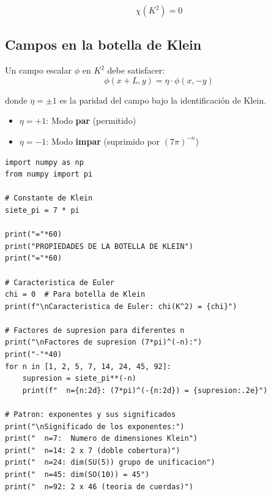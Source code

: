 \documentclass[12pt,a4paper,openany]{book}
\begin{document}
\begin{nivelmatematico}
\begin{equation}
    \chi(K^2) = 0
\end{equation}

\subsection*{Campos en la botella de Klein}

Un campo escalar $\phi$ en $K^2$ debe satisfacer:
\begin{equation}
    \phi(x + L, y) = \eta \cdot \phi(x, -y)
\end{equation}

donde $\eta = \pm 1$ es la paridad del campo bajo la identificación de Klein.

\begin{itemize}
    \item $\eta = +1$: Modo \textbf{par} (permitido)
    \item $\eta = -1$: Modo \textbf{impar} (suprimido por $(7\pi)^{-n}$)
\end{itemize}

\end{nivelmatematico}

\begin{nivelcodigo}

\begin{lstlisting}[caption={Verificación de propiedades topológicas}]
import numpy as np
from numpy import pi

# Constante de Klein
siete_pi = 7 * pi

print("="*60)
print("PROPIEDADES DE LA BOTELLA DE KLEIN")
print("="*60)

# Caracteristica de Euler
chi = 0  # Para botella de Klein
print(f"\nCaracteristica de Euler: chi(K^2) = {chi}")

# Factores de supresion para diferentes n
print("\nFactores de supresion (7*pi)^(-n):")
print("-"*40)
for n in [1, 2, 5, 7, 14, 24, 45, 92]:
    supresion = siete_pi**(-n)
    print(f"  n={n:2d}: (7*pi)^(-{n:2d}) = {supresion:.2e}")

# Patron: exponentes y sus significados
print("\nSignificado de los exponentes:")
print("  n=7:  Numero de dimensiones Klein")
print("  n=14: 2 x 7 (doble cobertura)")
print("  n=24: dim(SU(5)) grupo de unificacion")
print("  n=45: dim(SO(10)) = 45")
print("  n=92: 2 x 46 (teoria de cuerdas)")
\end{lstlisting}

\end{nivelcodigo}
\end{document}

